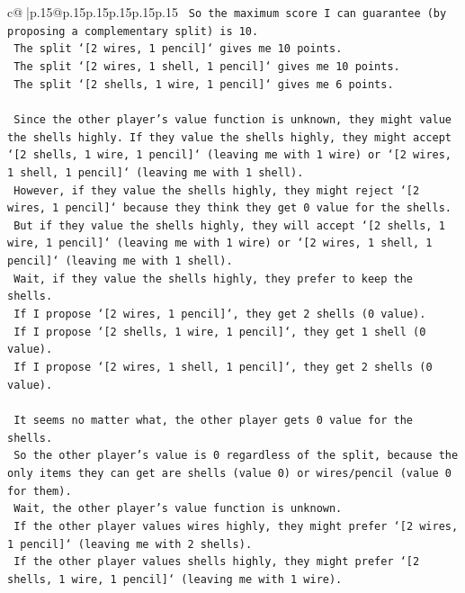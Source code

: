 \documentclass{article}
\begin{document}
{\begin{supertabular}{c@{$\;$}|p{.15\linewidth}@{}p{.15\linewidth}p{.15\linewidth}p{.15\linewidth}p{.15\linewidth}p{.15\linewidth}}
{{{\texttt{    So the maximum score I can guarantee (by proposing a complementary split) is 10.} \\
\texttt{    The split `{[}2 wires, 1 pencil{]}` gives me 10 points.} \\
\texttt{    The split `{[}2 wires, 1 shell, 1 pencil{]}` gives me 10 points.} \\
\texttt{    The split `{[}2 shells, 1 wire, 1 pencil{]}` gives me 6 points.} \\
\\ 
\texttt{    Since the other player's value function is unknown, they might value the shells highly. If they value the shells highly, they might accept `{[}2 shells, 1 wire, 1 pencil{]}` (leaving me with 1 wire) or `{[}2 wires, 1 shell, 1 pencil{]}` (leaving me with 1 shell).} \\
\texttt{    However, if they value the shells highly, they might reject `{[}2 wires, 1 pencil{]}` because they think they get 0 value for the shells.} \\
\texttt{    But if they value the shells highly, they will accept `{[}2 shells, 1 wire, 1 pencil{]}` (leaving me with 1 wire) or `{[}2 wires, 1 shell, 1 pencil{]}` (leaving me with 1 shell).} \\
\texttt{    Wait, if they value the shells highly, they prefer to keep the shells.} \\
\texttt{    If I propose `{[}2 wires, 1 pencil{]}`, they get 2 shells (0 value).} \\
\texttt{    If I propose `{[}2 shells, 1 wire, 1 pencil{]}`, they get 1 shell (0 value).} \\
\texttt{    If I propose `{[}2 wires, 1 shell, 1 pencil{]}`, they get 2 shells (0 value).} \\
\\ 
\texttt{    It seems no matter what, the other player gets 0 value for the shells.} \\
\texttt{    So the other player's value is 0 regardless of the split, because the only items they can get are shells (value 0) or wires/pencil (value 0 for them).} \\
\texttt{    Wait, the other player's value function is unknown.} \\
\texttt{    If the other player values wires highly, they might prefer `{[}2 wires, 1 pencil{]}` (leaving me with 2 shells).} \\
\texttt{    If the other player values shells highly, they might prefer `{[}2 shells, 1 wire, 1 pencil{]}` (leaving me with 1 wire).} \\
}}}
\end{supertabular}}
\end{document}
